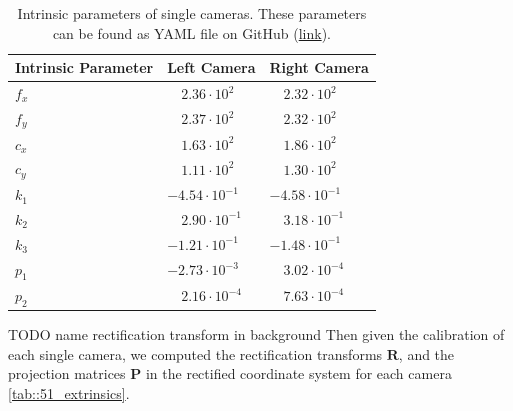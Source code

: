 \begin{table}
	\centering
	\begin{tabular}{lll}
		Intrinsic Parameter & Left Camera & Right Camera\\
		\hline
		$f_x$ & $\quad2.36\cdot10^2$ & $\quad2.32\cdot10^2$ \\
		$f_y$ & $\quad2.37\cdot10^2$ & $\quad2.32\cdot10^2$ \\
		$c_x$ & $\quad1.63\cdot10^2$ & $\quad1.86\cdot10^2$ \\
		$c_y$ & $\quad1.11\cdot10^2$ & $\quad1.30\cdot10^2$ \\
		$k_1$ & $-4.54\cdot10^{-1}$ & $-4.58\cdot10^{-1}$ \\
		$k_2$ & $\quad2.90\cdot10^{-1}$  & $\quad3.18\cdot10^{-1}$  \\
		$k_3$ & $-1.21\cdot10^{-1}$ & $-1.48\cdot10^{-1}$ \\
		$p_1$ & $-2.73\cdot10^{-3}$ & $\quad3.02\cdot10^{-4}$  \\
		$p_2$ & $\quad2.16\cdot10^{-4}$  & $\quad7.63\cdot10^{-4}$		
	\end{tabular}
	\caption{Intrinsic parameters of single cameras. These parameters can be found as YAML file on GitHub (\href{https://github.com/mhubii/nmpc_pattern_generator/tree/master/libs/io_module}{link}).\label{tab::51_intrinsics}}
\end{table}
TODO name rectification transform in background
Then given the calibration of each single camera, we computed the rectification transforms $\bm{R}$, and the projection matrices $\bm{P}$ in the rectified coordinate system for each camera \ref{tab::51_extrinsics}.
